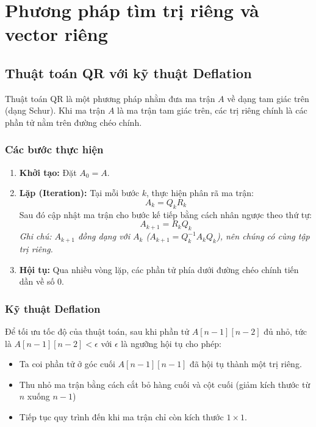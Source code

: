 \section{Phương pháp tìm trị riêng và vector riêng}

\subsection{Thuật toán QR với kỹ thuật Deflation}

Thuật toán QR là một phương pháp nhằm đưa ma trận $A$ về dạng tam giác trên (dạng Schur). Khi ma trận $A$ là ma trận tam giác trên, các trị riêng chính là các phần tử nằm trên đường chéo chính.

\newpage

\subsubsection{Các bước thực hiện}

\begin{enumerate}[topsep=0pt, itemsep=2.5pt, leftmargin=1.5cm]
    \item \textbf{Khởi tạo:} Đặt $A_0 = A$.
    
    \item \textbf{Lặp (Iteration):} Tại mỗi bước $k$, thực hiện phân rã ma trận:
    \begin{equation*}
        A_k = Q_k R_k
    \end{equation*}
    Sau đó cập nhật ma trận cho bước kế tiếp bằng cách nhân ngược theo thứ tự:
    \begin{equation*}
        A_{k+1} = R_k Q_k
    \end{equation*}
    \textit{Ghi chú: $A_{k+1}$ đồng dạng với $A_k$ ($A_{k+1} = Q_k^{-1} A_k Q_k$), nên chúng có cùng tập trị riêng.}
    
    \item \textbf{Hội tụ:} Qua nhiều vòng lặp, các phần tử phía dưới đường chéo chính tiến dần về số 0.
\end{enumerate}

\subsubsection{Kỹ thuật Deflation}

Để tối ưu tốc độ của thuật toán, sau khi phần tử $A[n - 1][n - 2]$ đủ nhỏ, tức là $A[n - 1][n - 2] < \epsilon$ với $\epsilon$ là ngưỡng hội tụ cho phép:

\begin{itemize}[topsep=0pt, itemsep=2.5pt, leftmargin=1.5cm]
    \item Ta coi phần tử ở góc cuối $A[n - 1][n - 1]$ đã hội tụ thành một trị riêng.
    \item Thu nhỏ ma trận bằng cách cắt bỏ hàng cuối và cột cuối (giảm kích thước từ $n$ xuống $n - 1$)
    \item Tiếp tục quy trình đến khi ma trận chỉ còn kích thước $1 \times 1$.
\end{itemize}

